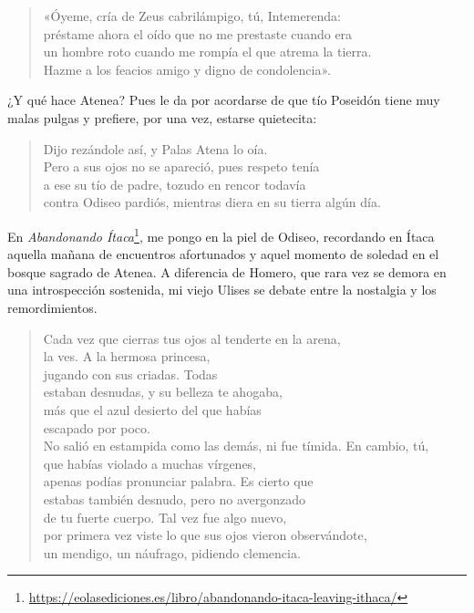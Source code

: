 \documentclass[11pt,a4paper]{article}
\begin{document}
\begin{verse}
«Óyeme, cría de Zeus cabrilámpigo, tú, Intemerenda:\\
préstame ahora el oído que no me prestaste cuando era\\
un hombre roto cuando me rompía el que atrema la tierra.\\
Hazme a los feacios amigo y digno de condolencia».
\end{verse}

¿Y qué hace Atenea? Pues le da por acordarse de que tío Poseidón tiene muy malas pulgas y prefiere, por una vez, estarse quietecita:


\begin{verse}
Dijo rezándole así, y Palas Atena lo oía.\\
Pero a sus ojos no se apareció, pues respeto tenía\\
a ese su tío de padre, tozudo en rencor todavía\\
contra Odiseo pardiós, mientras diera en su tierra algún día.
\end{verse}

En \emph{Abandonando Ítaca}\footnote{\url{https://eolasediciones.es/libro/abandonando-itaca-leaving-ithaca/}}, me pongo en la piel de Odiseo, recordando en Ítaca aquella mañana de encuentros afortunados y aquel momento de soledad en el bosque sagrado de Atenea. A diferencia de Homero, que rara vez se demora en una introspección sostenida, mi viejo Ulises se debate entre la nostalgia y los remordimientos.

\begin{verse}
Cada vez que cierras tus ojos al tenderte en la arena,\\
la ves. A la hermosa princesa,\\
jugando con sus criadas. Todas\\
estaban desnudas, y su belleza te ahogaba,\\
más que el azul desierto del que habías\\
escapado por poco.\\
No salió en estampida como las demás, ni fue tímida. En cambio, tú,\\
que habías violado a muchas vírgenes,\\
apenas podías pronunciar palabra. Es cierto que\\
estabas también desnudo, pero no avergonzado\\
de tu fuerte cuerpo. Tal vez fue algo nuevo,\\
por primera vez viste lo que sus ojos vieron observándote,\\
un mendigo, un náufrago, pidiendo clemencia.
\end{verse}
\end{document}
